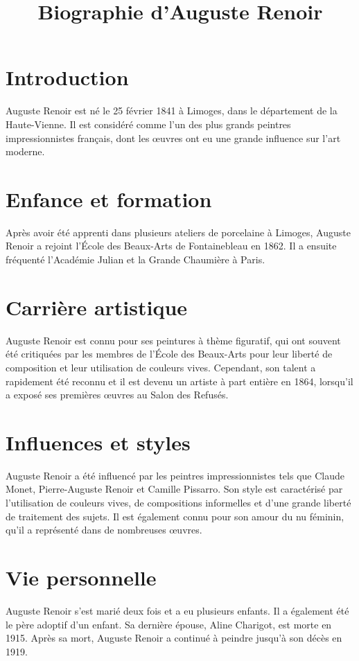 \documentclass[12pt, a4paper]{article}
\title{Biographie d'Auguste Renoir}
\author{}
\date{}
\begin{document}
   \maketitle
\section*{Introduction}
   \noindent
   Auguste Renoir est né le 25 février 1841 à Limoges, dans le département de la Haute-Vienne. Il est considéré comme l'un des plus grands peintres impressionnistes français, dont les œuvres ont eu une grande influence sur l'art moderne.
\section*{Enfance et formation}
   \noindent
   Après avoir été apprenti dans plusieurs ateliers de porcelaine à Limoges, Auguste Renoir a rejoint l'École des Beaux-Arts de Fontainebleau en 1862. Il a ensuite fréquenté l'Académie Julian et la Grande Chaumière à Paris.
   \section*{Carrière artistique}
   \noindent
   Auguste Renoir est connu pour ses peintures à thème figuratif, qui ont souvent été critiquées par les membres de l'École des Beaux-Arts pour leur liberté de composition et leur utilisation de couleurs vives. Cependant, son talent a rapidement été reconnu et il est devenu un artiste à part entière en 1864, lorsqu'il a exposé ses premières œuvres au Salon des Refusés.
   \section*{Influences et styles}
   \noindent
   Auguste Renoir a été influencé par les peintres impressionnistes tels que Claude Monet, Pierre-Auguste Renoir et Camille Pissarro. Son style est caractérisé par l'utilisation de couleurs vives, de compositions informelles et d'une grande liberté de traitement des sujets. Il est également connu pour son amour du nu féminin, qu'il a représenté dans de nombreuses œuvres.
   \section*{Vie personnelle}
   \noindent
   Auguste Renoir s'est marié deux fois et a eu plusieurs enfants. Il a également été le père adoptif d'un enfant. Sa dernière épouse, Aline Charigot, est morte en 1915. Après sa mort, Auguste Renoir a continué à peindre jusqu'à son décès en 1919.
\end{document}
